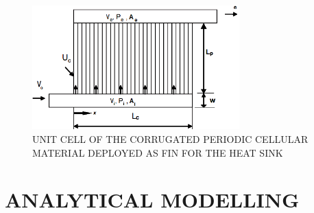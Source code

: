 \documentclass[twocolumn,10pt,cleanfoot]{ihmtc}
\begin{document}
%
\begin{figure}[ht]
\centerline{\includegraphics[width=80mm,scale=0.50]{unitcell.PNG}}
\vspace{-1.5ex}
\caption{\small{UNIT CELL OF THE CORRUGATED PERIODIC CELLULAR MATERIAL DEPLOYED AS FIN FOR THE HEAT SINK}}
\vspace{-2.5em}
\label{unitcell}
\end{figure}
%
\section{ANALYTICAL MODELLING}
\end{document}
